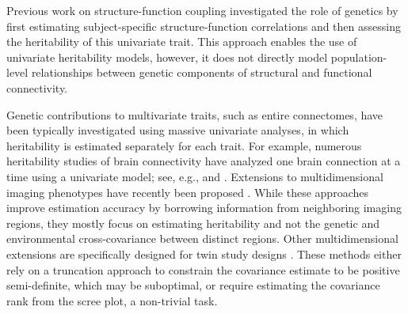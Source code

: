 \documentclass[12pt]{article}
\begin{document}

Previous work on structure-function coupling \parencite{gu2021heritability} investigated the role of genetics by first estimating subject-specific structure-function correlations and then assessing the heritability of this univariate trait. This approach enables the use of univariate heritability models, however, it does not directly model population-level relationships between genetic components of structural and functional connectivity.

Genetic contributions to multivariate traits, such as entire connectomes, have been typically investigated using massive univariate analyses, in which heritability is estimated separately for each trait. For example, numerous heritability studies of brain connectivity have analyzed one brain connection at a time using a univariate model; see, e.g., \textcite{colclough2017heritability,ge2017heritability} and \textcite{elliott2018genomewide}. %
Extensions to multidimensional imaging phenotypes have recently been proposed \parencite{tian2023bayesian, zhao2022bayesian, zhao2022genetic}. While these approaches improve estimation accuracy by borrowing information from neighboring imaging regions, they mostly focus on estimating heritability and not the genetic and environmental cross-covariance between distinct regions. Other multidimensional extensions are specifically designed for twin study designs \parencite{risk2021ace, luo2019fsem}. These methods either rely on a truncation approach to constrain the covariance estimate to be positive semi-definite, which may be suboptimal, or require estimating the covariance rank from the scree plot, a non-trivial task.
\end{document}
